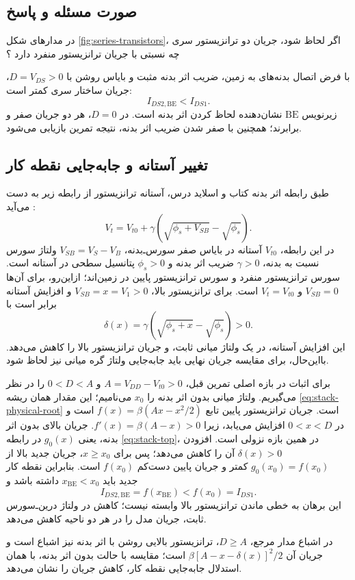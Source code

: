 \subsection*{صورت مسئله و پاسخ}
در مدارهای شکل \ref{fig:series-transistors}، اگر  لحاظ شود، جریان دو ترانزیستور سری چه نسبتی با جریان ترانزیستور منفرد دارد
\cite[تمرین ، صفحه چاپی ۹۵]{weste}؟

با فرض اتصال بدنه‌های  به زمین، ضریب اثر بدنه مثبت و بایاس روشن با \(D=V_{DS}>0\)، جریان ساختار سری کمتر است:
\begin{equation}
 \boxed{I_{DS2,\mathrm{BE}}<I_{DS1}.}
 \label{eq:body-result}
\end{equation}
زیرنویس \(\mathrm{BE}\) نشان‌دهنده لحاظ کردن اثر بدنه است.
در \(D=0\)، هر دو جریان صفر و برابرند؛ همچنین با صفر شدن ضریب اثر بدنه، نتیجه تمرین  بازیابی می‌شود.

\subsection*{تغییر آستانه و جابه‌جایی نقطه کار}
طبق رابطه اثر بدنه کتاب و اسلاید درس، آستانه ترانزیستور از رابطه زیر به دست می‌آید
\cite[بخش ، رابطه ]{weste}\cite[اسلاید ۱۶]{nonideal}:
\begin{equation}
 V_t=V_{t0}+\gamma\left(\sqrt{\phi_s+V_{SB}}-\sqrt{\phi_s}\right).
 \label{eq:body-threshold}
\end{equation}
در این رابطه، \(V_{t0}\) آستانه در بایاس صفر سورس‌ـ‌بدنه،
\(V_{SB}=V_S-V_B\) ولتاژ سورس نسبت به بدنه،
\(\gamma>0\) ضریب اثر بدنه و \(\phi_s>0\) پتانسیل سطحی در آستانه است.
سورس ترانزیستور منفرد و سورس ترانزیستور پایین در زمین‌اند؛ ازاین‌رو، برای آن‌ها \(V_{SB}=0\) و \(V_t=V_{t0}\) است.
برای ترانزیستور بالا، \(V_{SB}=x=V_1>0\) و افزایش آستانه برابر است با
\begin{equation}
 \delta(x)=\gamma\left(\sqrt{\phi_s+x}-\sqrt{\phi_s}\right)>0.
 \label{eq:body-delta}
\end{equation}
این افزایش آستانه، در یک ولتاژ میانی ثابت،  و جریان ترانزیستور بالا را کاهش می‌دهد.
بااین‌حال، برای مقایسه جریان نهایی باید جابه‌جایی ولتاژ گره میانی نیز لحاظ شود.

برای اثبات در بازه اصلی تمرین قبل، \(A=V_{DD}-V_{t0}>0\) و \(0<D<A\) را در نظر می‌گیریم.
ولتاژ میانی بدون اثر بدنه را \(x_0\) می‌نامیم؛ این مقدار همان ریشه \eqref{eq:stack-physical-root} است.
جریان ترانزیستور پایین تابع
\(f(x)=\beta(Ax-x^2/2)\) است و در \(0<x<D\) افزایش می‌یابد، زیرا
\(f'(x)=\beta(A-x)>0\).
جریان بالای بدون اثر بدنه، یعنی \(g_0(x)\) در رابطه \eqref{eq:stack-top}، در همین بازه نزولی است.
افزودن \(\delta(x)>0\) آن را کاهش می‌دهد؛ پس برای \(x\ge x_0\)، جریان جدید بالا از \(g_0(x_0)=f(x_0)\) کمتر و جریان پایین دست‌کم \(f(x_0)\) است.
بنابراین نقطه کار جدید باید \(x_{\mathrm{BE}}<x_0\) داشته باشد و
\begin{equation}
 I_{DS2,\mathrm{BE}}=f(x_{\mathrm{BE}})<f(x_0)=I_{DS1}.
 \label{eq:body-current-proof}
\end{equation}
این برهان به خطی ماندن ترانزیستور بالا وابسته نیست؛ کاهش  در ولتاژ درین‌ـ‌سورس ثابت، جریان مدل  را در هر دو ناحیه کاهش می‌دهد.

در اشباع مدار مرجع، \(D\ge A\)، ترانزیستور بالایی روشن با اثر بدنه نیز اشباع است و جریان آن
\(\beta[A-x-\delta(x)]^2/2\) است؛ مقایسه با حالت بدون اثر بدنه، با همان استدلال جابه‌جایی نقطه کار، کاهش جریان را نشان می‌دهد.
